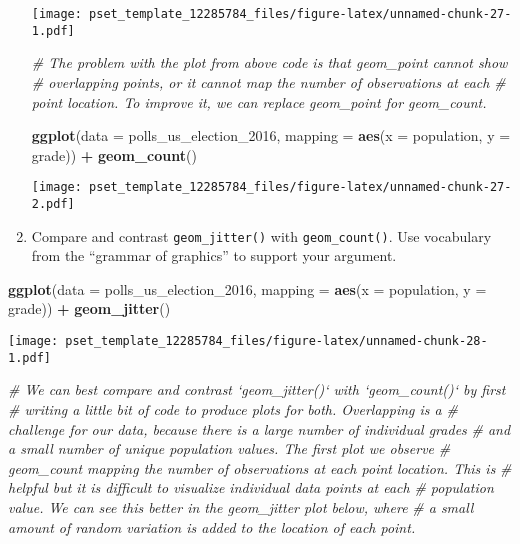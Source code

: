 \documentclass[
]{article}
\newenvironment{Shaded}{\begin{snugshade}}{\end{snugshade}}
\newcommand{\CommentTok}[1]{\textcolor[rgb]{0.56,0.35,0.01}{\textit{#1}}}
\newcommand{\DataTypeTok}[1]{\textcolor[rgb]{0.13,0.29,0.53}{#1}}
\newcommand{\DecValTok}[1]{\textcolor[rgb]{0.00,0.00,0.81}{#1}}
\newcommand{\KeywordTok}[1]{\textcolor[rgb]{0.13,0.29,0.53}{\textbf{#1}}}
\newcommand{\NormalTok}[1]{#1}
\newcommand{\OperatorTok}[1]{\textcolor[rgb]{0.81,0.36,0.00}{\textbf{#1}}}
\newcommand{\StringTok}[1]{\textcolor[rgb]{0.31,0.60,0.02}{#1}}
\begin{document}
\begin{enumerate}
  \texttt{[image: pset\_template\_12285784\_files/figure-latex/unnamed-chunk-27-1.pdf]}

\begin{Shaded}
\begin{Highlighting}[]
\CommentTok{# The problem with the plot from above code is that geom_point cannot show}
\CommentTok{# overlapping points, or it cannot map the number of observations at each }
\CommentTok{# point location. To improve it, we can replace geom_point for geom_count.}

    \KeywordTok{ggplot}\NormalTok{(}\DataTypeTok{data =}\NormalTok{ polls_us_election_}\DecValTok{2016}\NormalTok{, }
       \DataTypeTok{mapping =} \KeywordTok{aes}\NormalTok{(}\DataTypeTok{x =}\NormalTok{ population, }\DataTypeTok{y =}\NormalTok{ grade)) }\OperatorTok{+}\StringTok{ }
\StringTok{  }\KeywordTok{geom_count}\NormalTok{()}
\end{Highlighting}
\end{Shaded}

  \texttt{[image: pset\_template\_12285784\_files/figure-latex/unnamed-chunk-27-2.pdf]}
\item
  Compare and contrast \texttt{geom\_jitter()} with
  \texttt{geom\_count()}. Use vocabulary from the ``grammar of
  graphics'' to support your argument.
\end{enumerate}

\begin{Shaded}
\begin{Highlighting}[]
        \KeywordTok{ggplot}\NormalTok{(}\DataTypeTok{data =}\NormalTok{ polls_us_election_}\DecValTok{2016}\NormalTok{, }
           \DataTypeTok{mapping =} \KeywordTok{aes}\NormalTok{(}\DataTypeTok{x =}\NormalTok{ population, }\DataTypeTok{y =}\NormalTok{ grade)) }\OperatorTok{+}\StringTok{ }
\StringTok{      }\KeywordTok{geom_jitter}\NormalTok{()}
\end{Highlighting}
\end{Shaded}

\texttt{[image: pset\_template\_12285784\_files/figure-latex/unnamed-chunk-28-1.pdf]}

\begin{Shaded}
\begin{Highlighting}[]
\CommentTok{# We can best compare and contrast `geom_jitter()` with `geom_count()` by first}
\CommentTok{# writing a little bit of code to produce plots for both. Overlapping is a }
\CommentTok{# challenge for our data, because there is a large number of individual grades}
\CommentTok{# and a small number of unique population values. The first plot we observe}
\CommentTok{# geom_count mapping the number of observations at each point location. This is}
\CommentTok{# helpful but it is difficult to visualize individual data points at each}
\CommentTok{# population value. We can see this better in the geom_jitter plot below, where}
\CommentTok{# a small amount of random variation is added to the location of each point.}
\end{Highlighting}
\end{Shaded}
\end{document}
